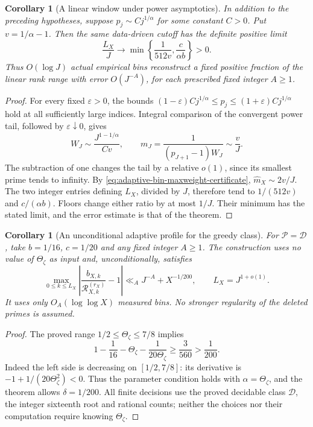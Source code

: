 \documentclass[11pt]{article}
\newtheorem{corollary}[theorem]{Corollary}
\theoremstyle{definition}
\begin{document}
\begin{corollary}[A linear window under power asymptotics]
\label{cor:adaptive-bin-linear-power-law}
In addition to the preceding hypotheses, suppose
$p_j\sim Cj^{1/\alpha}$ for some constant $C>0$.
Put $v=1/\alpha-1$.
Then the same data-driven cutoff has the definite positive limit
\begin{equation}
 \frac{L_X}{J}\longrightarrow
       \min\left\{\frac1{512v},\frac{c}{\alpha b}\right\}>0 .
 \label{eq:adaptive-bin-linear-limit}
\end{equation}
Thus $O(\log J)$ actual empirical bins reconstruct a fixed
positive fraction of the linear rank range with error
$O(J^{-A})$, for each prescribed fixed integer $A\ge1$.
\end{corollary}

\begin{proof}
For every fixed $\varepsilon>0$, the bounds
$(1-\varepsilon)Cj^{1/\alpha}\le p_j
 \le(1+\varepsilon)Cj^{1/\alpha}$ hold at all sufficiently
large indices.
Integral comparison of the convergent power tail, followed
by $\varepsilon\downarrow0$, gives
\[
 W_J\sim\frac{J^{1-1/\alpha}}{Cv},\qquad
 m_J=\frac1{(p_{J+1}-1)W_J}\sim\frac vJ .
\]
The subtraction of one changes the tail by a relative
$o(1)$, since its smallest prime tends to infinity.
By \eqref{eq:adaptive-bin-maxweight-certificate},
$\widehat m_X\sim2v/J$.
The two integer entries defining $L_X$, divided by $J$,
therefore tend to $1/(512v)$ and $c/(\alpha b)$.
Floors change either ratio by at most $1/J$.
Their minimum has the stated limit, and the error estimate
is that of the theorem.
\end{proof}

\begin{corollary}[An unconditional adaptive profile for the greedy class]
\label{cor:adaptive-bin-greedy-class}
For $\mathcal P=\mathcal D$, take $b=1/16$, $c=1/20$ and
any fixed integer $A\ge1$.
The construction uses no value of $\Theta_\zeta$ as input and,
unconditionally, satisfies
\begin{equation}
 \max_{0\le k\le L_X}
  \left|\frac{b_{X,k}}{\mathcal R^{(r_X)}_{X,k}}-1\right|
       \ll_A J^{-A}+X^{-1/200},\qquad L_X=J^{1+o(1)} .
 \label{eq:adaptive-bin-greedy-unconditional}
\end{equation}
It uses only $O_A(\log\log X)$ measured bins.
No stronger regularity of the deleted primes is assumed.
\end{corollary}

\begin{proof}
The proved range $1/2\le\Theta_\zeta\le7/8$ implies
\[
 1-\frac1{16}-\Theta_\zeta-\frac1{20\Theta_\zeta}
       \ge\frac3{560}>\frac1{200}.
\]
Indeed the left side is decreasing on $[1/2,7/8]$:
its derivative is $-1+1/(20\Theta_\zeta^2)<0$.
Thus the parameter condition holds with
$\alpha=\Theta_\zeta$, and the theorem allows $\delta=1/200$.
All finite decisions use the proved decidable class
$\mathcal D$, the integer sixteenth root and rational counts;
neither the choices nor their computation require knowing
$\Theta_\zeta$.
\end{proof}
\end{document}
